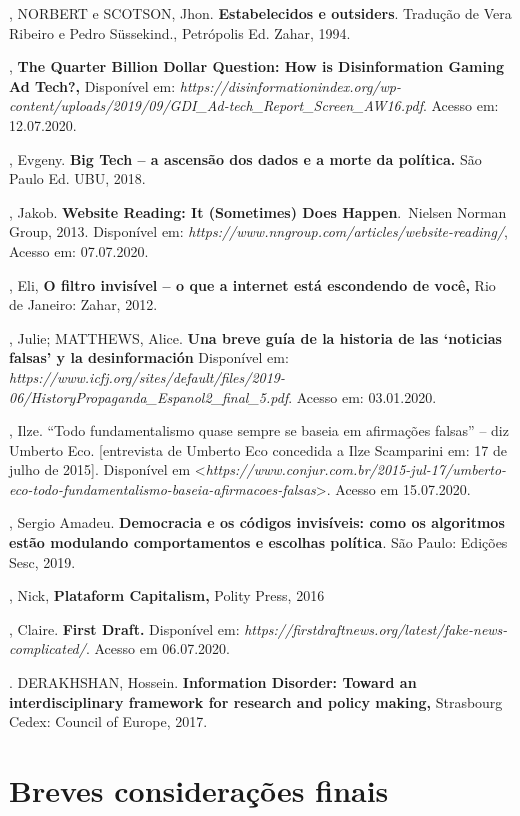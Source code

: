 \begin{bibliohedra}
, NORBERT e SCOTSON, Jhon. \textbf{Estabelecidos e outsiders}.
Tradução de Vera Ribeiro e Pedro Süssekind., Petrópolis Ed. Zahar, 1994.

, \textbf{The Quarter Billion Dollar
Question: How is Disinformation Gaming Ad Tech?,} Disponível em:
\emph{https://disinformationindex.org/wp-content/uploads/2019/09/GDI\_Ad-tech\_Report\_Screen\_AW16.pdf}.
Acesso em: 12.07.2020.

, Evgeny. \textbf{Big Tech -- a ascensão dos dados e a
morte da política.} São Paulo Ed. UBU, 2018.

, Jakob. \textbf{Website Reading: It (Sometimes) Does
Happen}.~Nielsen Norman Group, 2013. Disponível
em: \emph{https://www.nngroup.com/articles/website-reading/},
Acesso em: 07.07.2020.~

, Eli, \textbf{O filtro invisível -- o que a internet está
escondendo de você,} Rio de Janeiro: Zahar, 2012.

, Julie; MATTHEWS, Alice. \textbf{Una breve guía de la historia
de las `noticias falsas' y la desinformación} Disponível em:
\emph{https://www.icfj.org/sites/default/files/2019-06/HistoryPropaganda\_Espanol2\_final\_5.pdf}.
Acesso em: 03.01.2020.

, Ilze. ``Todo fundamentalismo quase
sempre se baseia em afirmações falsas'' -- diz Umberto
Eco. {[}entrevista de Umberto Eco concedida a Ilze
Scamparini em: 17 de julho de 2015{]}. Disponível em
\textless{}\emph{https://www.conjur.com.br/2015-jul-17/umberto-eco-todo-fundamentalismo-baseia-afirmacoes-falsas}\textgreater{}.
Acesso em 15.07.2020.

, Sergio Amadeu. \textbf{Democracia e os códigos
invisíveis: como os algoritmos estão modulando comportamentos e escolhas
política}. São Paulo: Edições Sesc, 2019.

, Nick, \textbf{Plataform Capitalism,} Polity Press, 2016

, Claire. \textbf{First Draft.} Disponível em:
\emph{https://firstdraftnews.org/latest/fake-news-complicated/}.
Acesso em 06.07.2020.

\titidem. DERAKHSHAN, Hossein. \textbf{Information
Disorder: Toward an interdisciplinary framework for research and policy
making,} Strasbourg Cedex: Council of Europe, 2017.
\end{bibliohedra}

\chapter{Breves considerações finais}

